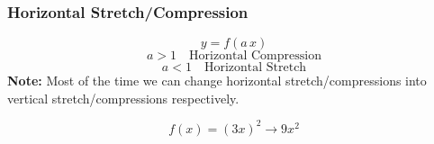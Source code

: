 \subsubsection{Horizontal Stretch/Compression}
\begin{definition}
  $$y = f(a\,x)$$
  $$a > 1 \quad \text{Horizontal Compression}$$
  $$a < 1 \quad \text{Horizontal Stretch}$$
  \textbf{Note: } Most of the time we can change horizontal stretch/compressions into vertical stretch/compressions respectively.
\end{definition}
\begin{example}
  $$f(x) = (3x)^2 \to 9x^2$$
  \begin{center}
  \end{center}
\end{example}
